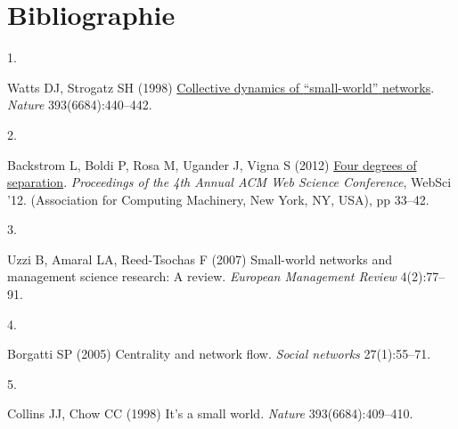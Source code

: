 \documentclass[9pt,twocolumn,twoside,]{pnas-new}
\newlength{\cslhangindent}
\newlength{\csllabelwidth}
\newlength{\cslentryspacingunit} %
\newenvironment{CSLReferences}[2] %
 {%
  \setlength{\parindent}{0pt}
  \ifodd #1
  \let\oldpar\par
  \def\par{\hangindent=\cslhangindent\oldpar}
  \fi
  \setlength{\parskip}{#2\cslentryspacingunit}
 }%
 {}
\newcommand{\CSLLeftMargin}[1]{\parbox[t]{\csllabelwidth}{#1}}
\newcommand{\CSLRightInline}[1]{\parbox[t]{\linewidth - \csllabelwidth}{#1}\break}
\begin{document}
\newpage

\hypertarget{bibliographie}{%
\section*{Bibliographie}\label{bibliographie}}

\hypertarget{refs}{}
\begin{CSLReferences}{0}{0}
\leavevmode{}%
\CSLLeftMargin{1. }
\CSLRightInline{Watts DJ, Strogatz SH (1998)
\href{https://doi.org/10.1038/30918}{Collective dynamics of
{``small-world''} networks}. \emph{Nature} 393(6684):440--442.}

\leavevmode{}%
\CSLLeftMargin{2. }
\CSLRightInline{Backstrom L, Boldi P, Rosa M, Ugander J, Vigna S (2012)
\href{https://doi.org/10.1145/2380718.2380723}{Four degrees of
separation}. \emph{Proceedings of the 4th Annual ACM Web Science
Conference}, WebSci '12. (Association for Computing Machinery, New York,
NY, USA), pp 33--42.}

\leavevmode{}%
\CSLLeftMargin{3. }
\CSLRightInline{Uzzi B, Amaral LA, Reed-Tsochas F (2007) Small-world
networks and management science research: A review. \emph{European
Management Review} 4(2):77--91.}

\leavevmode{}%
\CSLLeftMargin{4. }
\CSLRightInline{Borgatti SP (2005) Centrality and network flow.
\emph{Social networks} 27(1):55--71.}

\leavevmode{}%
\CSLLeftMargin{5. }
\CSLRightInline{Collins JJ, Chow CC (1998) It's a small world.
\emph{Nature} 393(6684):409--410.}

\end{CSLReferences}



% 
\end{document}
